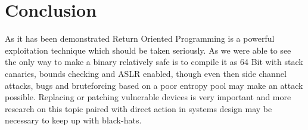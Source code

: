 \documentclass[journal=tosc,submission, notanonymous]{iacrtrans}
\begin{document}
\section{Conclusion}
As it has been demonstrated Return Oriented Programming is a powerful exploitation technique which should be taken seriously. As we were able to see the only way to make a binary relatively safe is to compile it as 64 Bit with stack canaries, bounds checking and ASLR enabled, though even then side channel attacks, bugs and bruteforcing based on a poor entropy pool may make an attack possible. Replacing or patching vulnerable devices is very important and more research on this topic paired with direct action in systems design may be necessary to keep up with black-hats.


\end{document}

